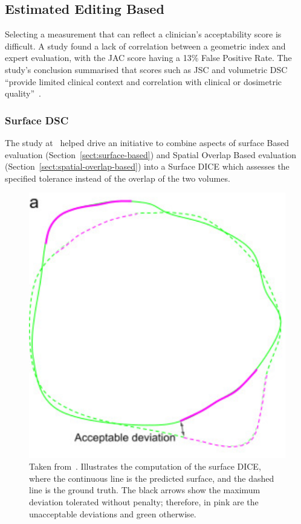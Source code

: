 \documentclass[12pt,twoside]{report}
\begin{document}
\subsection{Estimated Editing Based}\label{sect:surface-dice}

Selecting a measurement that can reflect a clinician's acceptability score is difficult. A study found a lack of correlation between a geometric index and expert evaluation, with the JAC score having a 13\% False Positive Rate. The study's conclusion summarised that scores such as JSC and volumetric DSC ``provide limited clinical context and correlation with clinical or dosimetric quality''~\cite{Sherer2021-le}.


\subsubsection{Surface DSC}\label{sect:surface-DSC}

The study at~\cite{Sherer2021-le} helped drive an initiative to combine aspects of surface Based evaluation (Section~\ref{sect:surface-based}) and Spatial Overlap Based evaluation (Section~\ref{sect:spatial-overlap-based}) into a Surface DICE which assesses the specified tolerance instead of the overlap of the two volumes.

\begin{figure}
  \centering
  \includegraphics[width=0.3\linewidth]{../figures/Surface-dice.png}
  \caption{Taken from~\cite{Nikolov2021-xe}. Illustrates the computation of the surface DICE, where the continuous line is the predicted surface, and the dashed line is the ground truth. The black arrows show the maximum deviation tolerated without penalty; therefore, in pink are the unacceptable deviations and green otherwise.}\label{fig:surface-dice}
\end{figure}
\end{document}

